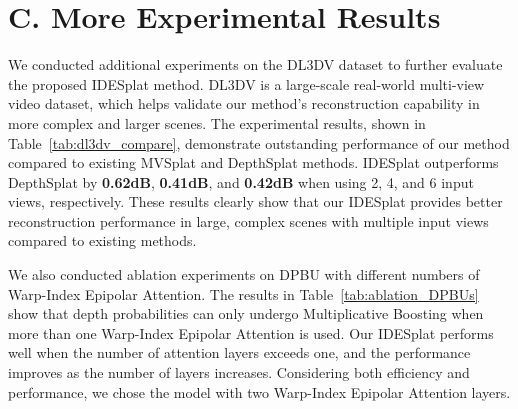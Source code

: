 \section*{C. More Experimental Results}
\label{sec:more_exp_results}

We conducted additional experiments on the DL3DV dataset to further evaluate the proposed IDESplat method. DL3DV is a large-scale real-world multi-view video dataset, which helps validate our method's reconstruction capability in more complex and larger scenes. The experimental results, shown in Table~\ref{tab:dl3dv_compare}, demonstrate outstanding performance of our method compared to existing MVSplat and DepthSplat methods. IDESplat outperforms DepthSplat by \textbf{0.62dB}, \textbf{0.41dB}, and\textbf{ 0.42dB} when using 2, 4, and 6 input views, respectively. These results clearly show that our IDESplat provides better reconstruction performance in large, complex scenes with multiple input views compared to existing methods. 

We also conducted ablation experiments on DPBU with different numbers of Warp-Index Epipolar Attention. The results in Table~\ref{tab:ablation_DPBUs} show that depth probabilities can only undergo Multiplicative Boosting when more than one Warp-Index Epipolar Attention is used. Our IDESplat performs well when the number of attention layers exceeds one, and the performance improves as the number of layers increases. Considering both efficiency and performance, we chose the model with two Warp-Index Epipolar Attention layers.

